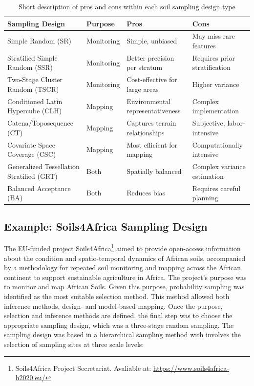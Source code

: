 \documentclass[
  10pt,
  b5paper,
  oneside]{book}
\begin{document}
\begin{table}

\caption{\label{tab:design-comparison}Short description of pros and cons within each soil sampling design type}
\centering
\begin{tabular}[t]{l|l|l|l}
\hline
Sampling Design & Purpose & Pros & Cons\\
\hline
Simple Random (SR) & Monitoring & Simple, unbiased & May miss rare features\\
\hline
Stratified Simple Random (SSR) & Monitoring & Better precision per stratum & Requires prior stratification\\
\hline
Two-Stage Cluster Random (TSCR) & Monitoring & Cost-effective for large areas & Higher variance\\
\hline
Conditioned Latin Hypercube (CLH) & Mapping & Environmental representativeness & Complex implementation\\
\hline
Catena/Toposequence (CT) & Mapping & Captures terrain relationships & Subjective, labor-intensive\\
\hline
Covariate Space Coverage (CSC) & Mapping & Most efficient for mapping & Computationally intensive\\
\hline
Generalized Tessellation Stratified (GRT) & Both & Spatially balanced & Complex variance estimation\\
\hline
Balanced Acceptance (BA) & Both & Reduces bias & Requires careful planning\\
\hline
\end{tabular}
\end{table}

\subsection{Example: Soils4Africa Sampling Design}\label{soils4africa-example}

The EU-funded project Soils4Africa\footnote{Soils4Africa Project Secretariat. Avaliable at: \url{https://www.soils4africa-h2020.eu/}} aimed to provide open-access information about the condition and spatio-temporal dynamics of African soils, accompanied by a methodology for repeated soil monitoring and mapping across the African continent to support sustainable agriculture in Africa. The project's purpose was to monitor and map African Soils. Given this purpose, probability sampling was identified as the most suitable selection method. This method allowed both inference methods, design- and model-based mapping. Once the purpose, selection and inference methods are defined, the final step was to choose the appropriate sampling design, which was a three-stage random sampling. The sampling design was based in a hierarchical sampling method with involves the selection of sampling sites at three scale levels:
\end{document}
